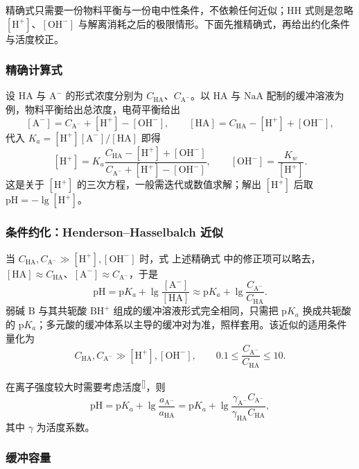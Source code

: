 \documentclass[UTF8]{ctexbook}
\begin{document}
精确式只需要一份物料平衡与一份电中性条件，不依赖任何近似；HH 式则是忽略 \([\mathrm{H^+}]\)、\([\mathrm{OH^-}]\) 与解离消耗之后的极限情形。下面先推精确式，再给出约化条件与活度校正。

\subsubsection{精确计算式}

设 \(\mathrm{HA}\) 与 \(\mathrm{A^-}\) 的形式浓度分别为 \(C_{\mathrm{HA}}\)、\(C_{\mathrm{A^-}}\)。以 \(\mathrm{HA}\) 与 \(\mathrm{NaA}\) 配制的缓冲溶液为例，物料平衡给出总浓度，电荷平衡给出
\[
  [\mathrm{A^-}]=C_{\mathrm{A^-}}+[\mathrm{H^+}]-[\mathrm{OH^-}],
  \qquad
  [\mathrm{HA}]=C_{\mathrm{HA}}-[\mathrm{H^+}]+[\mathrm{OH^-}],
\]
代入 \(K_a=[\mathrm{H^+}][\mathrm{A^-}]/[\mathrm{HA}]\) 即得
\[
  [\mathrm{H^+}]
  =
  K_a
  \frac{C_{\mathrm{HA}}-[\mathrm{H^+}]+[\mathrm{OH^-}]}
       {C_{\mathrm{A^-}}+[\mathrm{H^+}]-[\mathrm{OH^-}]},
  \qquad
  [\mathrm{OH^-}]=\frac{K_w}{[\mathrm{H^+}]}.
\]
这是关于 \([\mathrm{H^+}]\) 的三次方程，一般需迭代或数值求解；解出 \([\mathrm{H^+}]\) 后取 \(\mathrm{pH}=-\lg[\mathrm{H^+}]\)。

\subsubsection{条件约化：Henderson--Hasselbalch 近似}

当 \(C_{\mathrm{HA}},C_{\mathrm{A^-}}\gg[\mathrm{H^+}],[\mathrm{OH^-}]\) 时，式 上述精确式 中的修正项可以略去，\([\mathrm{HA}]\approx C_{\mathrm{HA}}\)、\([\mathrm{A^-}]\approx C_{\mathrm{A^-}}\)，于是
\[
  \mathrm{pH}
  = \mathrm{p}K_a+\lg\frac{[\mathrm{A^-}]}{[\mathrm{HA}]}
  \approx \mathrm{p}K_a+\lg\frac{C_{\mathrm{A^-}}}{C_{\mathrm{HA}}}.
\]
弱碱 \(\mathrm{B}\) 与其共轭酸 \(\mathrm{BH^+}\) 组成的缓冲溶液形式完全相同，只需把 \(\mathrm{p}K_a\) 换成共轭酸的 \(\mathrm{p}K_a\)；多元酸的缓冲体系以主导的缓冲对为准，照样套用。该近似的适用条件量化为
\[
  C_{\mathrm{HA}},C_{\mathrm{A^-}} \gg [\mathrm{H^+}],[\mathrm{OH^-}],
  \qquad
  0.1 \leq \frac{C_{\mathrm{A^-}}}{C_{\mathrm{HA}}} \leq 10.
\]

在离子强度较大时需要考虑活度\textsuperscript{[\pageref{sec:activity}]}，则
\[
  \mathrm{pH}
  = \mathrm{p}K_a
  + \lg\frac{a_{\mathrm{A^-}}}{a_{\mathrm{HA}}}
  = \mathrm{p}K_a
  + \lg\frac{\gamma_{\mathrm{A^-}}C_{\mathrm{A^-}}}
              {\gamma_{\mathrm{HA}}C_{\mathrm{HA}}},
\]
其中 \(\gamma\) 为活度系数。

\subsubsection{缓冲容量}
\end{document}
